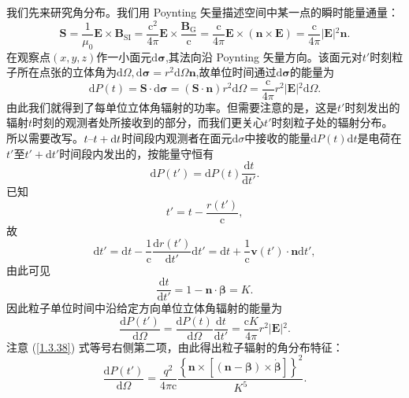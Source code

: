 \documentclass[../天体物理基础.tex]{subfiles}
\begin{document}
我们先来研究角分布。我们用 Poynting 矢量描述空间中某一点的瞬时能量通量：
\begin{equation}
\boldsymbol{S}=\frac{1}{\mu_{0}}\boldsymbol{E}\times\boldsymbol{B}_{\text{SI}}=\frac{\mathrm{c}^{2}}{4\pi}\boldsymbol{E}\times\frac{\boldsymbol{B}_{\text{G}}}{\mathrm{c}}=\frac{\mathrm{c}}{4\pi}\boldsymbol{E}\times\left(\boldsymbol{n}\times\boldsymbol{E}\right)=\frac{\mathrm{c}}{4\pi}\left\vert{}\boldsymbol{E}\right\vert{}^{2}\boldsymbol{n}.
\end{equation}
在观察点$\left(x,y,z\right)$作一小面元$\mathrm{d}\boldsymbol{\sigma}$,其法向沿 Poynting 矢量方向。该面元对$t'$时刻粒子所在点张的立体角为$\mathrm{d}\Omega,\mathrm{d}\boldsymbol{\sigma}=r^{2}\mathrm{d}\Omega\boldsymbol{n}$,故单位时间通过$\mathrm{d}\boldsymbol{\sigma}$的能量为
\begin{equation}
\mathrm{d}P\left(t\right)=\boldsymbol{S}\cdot\mathrm{d}\boldsymbol{\sigma}=\left(\boldsymbol{S}\cdot\boldsymbol{n}\right)r^{2}\mathrm{d}\Omega=\frac{\mathrm{c}}{4\pi}r^{2}\left\vert{}\boldsymbol{E}\right\vert{}^{2}\mathrm{d}\Omega.
\end{equation}
由此我们就得到了每单位立体角辐射的功率。但需要注意的是，这是$t'$时刻发出的辐射$t$时刻的观测者处所接收到的部分，而我们更关心$t'$时刻粒子处的辐射分布。所以需要改写。$t\text{\textendash}t+\mathrm{d}t$时间段内观测者在面元$\mathrm{d}\sigma$中接收的能量$\mathrm{d}P\left(t\right)\mathrm{d}t$是电荷在$t'$至$t'+\mathrm{d}t'$时间段内发出的，按能量守恒有
\begin{equation}
\mathrm{d}P\left(t'\right)=\mathrm{d}P\left(t\right)\frac{\mathrm{d}t}{\mathrm{d}t'}.
\end{equation}
已知
\begin{equation}
t'=t-\frac{r\left(t'\right)}{\mathrm{c}},
\end{equation}
故
\begin{equation}
\mathrm{d}t'=\mathrm{d}t-\frac{1}{\mathrm{c}}\frac{\mathrm{d}r\left(t'\right)}{\mathrm{d}t'}\mathrm{d}t'=\mathrm{d}t+\frac{1}{\mathrm{c}}\boldsymbol{v}\left(t'\right)\cdot\boldsymbol{n}\mathrm{d}t',
\end{equation}
由此可见
\begin{equation}
\frac{\mathrm{d}t}{\mathrm{d}t'}=1-\boldsymbol{n}\cdot\boldsymbol{\beta}=K.
\end{equation}
因此粒子单位时间中沿给定方向单位立体角辐射的能量为
\begin{equation}
\frac{\mathrm{d}P\left(t'\right)}{\mathrm{d}\Omega}=\frac{\mathrm{d}P\left(t\right)}{\mathrm{d}\Omega}\frac{\mathrm{d}t}{\mathrm{d}t'}=\frac{\mathrm{c}K}{4\pi}r^{2}\left\vert{}\boldsymbol{E}\right\vert{}^{2}.
\end{equation}
注意 (\ref{1.3.38}) 式等号右侧第二项，由此得出粒子辐射的角分布特征：
\begin{equation}
\frac{\mathrm{d}P\left(t'\right)}{\mathrm{d}\Omega}=\frac{q^{2}}{4\pi\mathrm{c}}\frac{\left\{\boldsymbol{n}\times\left[\left(\boldsymbol{n}-\boldsymbol{\beta}\right)\times\dot{\boldsymbol{\beta}}\right]\right\}^{2}}{K^{5}}.\label{1.3.46}
\end{equation}
\end{document}

